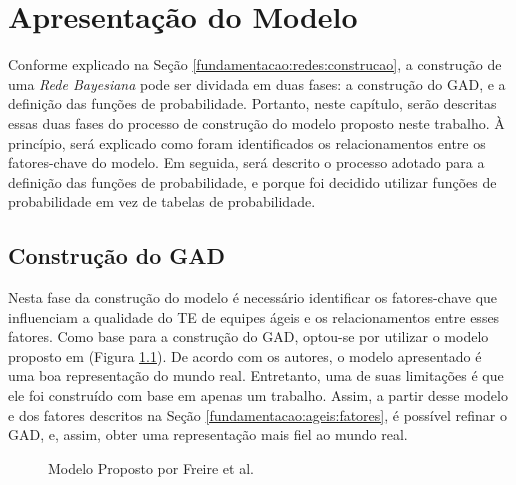 \chapter{Apresentação do Modelo}
\label{modelo}

Conforme explicado na Seção \ref{fundamentacao:redes:construcao}, a construção de uma \textit{Rede Bayesiana} pode ser dividada em duas fases: a construção do GAD, e a definição das funções de probabilidade. Portanto, neste capítulo, serão descritas essas duas fases do processo de construção do modelo proposto neste trabalho. À princípio, será explicado como foram identificados os relacionamentos entre os fatores-chave do modelo. Em seguida, será descrito o processo adotado para a definição das funções de probabilidade, e porque foi decidido utilizar funções de probabilidade em vez de tabelas de probabilidade.

\section{Construção do GAD}
\label{modelo:gad}

Nesta fase da construção do modelo é necessário identificar os fatores-chave que influenciam a qualidade do TE de equipes ágeis e os relacionamentos entre esses fatores. Como base para a construção do GAD, optou-se por utilizar o modelo proposto em \cite{freire} (Figura \ref{modelo:gad:freire}). De acordo com os autores, o modelo apresentado é uma boa representação do mundo real. Entretanto, uma de suas limitações é que ele foi construído com base em apenas um trabalho. Assim, a partir desse modelo e dos fatores descritos na Seção \ref{fundamentacao:ageis:fatores}, é possível refinar o GAD, e, assim, obter uma representação mais fiel ao mundo real.

\begin{figure}[ht!]
\begin{center}
	\end{center}
	\caption{Modelo Proposto por Freire et al.}
	\label{modelo:gad:freire}
\end{figure}

